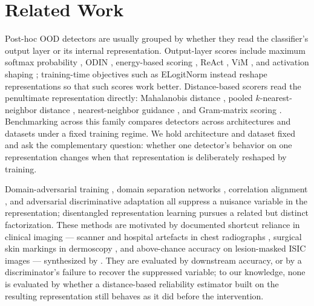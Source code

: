 \section{Related Work}
\label{sec:related-work}

Post-hoc OOD detectors are usually grouped by whether they read the classifier's output layer or its internal representation. Output-layer scores include maximum softmax probability \citep{hendrycks2017baseline}, ODIN \citep{liang2018enhancing}, energy-based scoring \citep{liu2020energy}, ReAct \citep{sun2021react}, ViM \citep{wang2022vim}, and activation shaping \citep{djurisic2023ash}; training-time objectives such as ELogitNorm \citep{ding2025enhancing} instead reshape representations so that such scores work better. Distance-based scorers read the penultimate representation directly: Mahalanobis distance \citep{lee2018simple}, pooled $k$-nearest-neighbor distance \citep{sun2022knn}, nearest-neighbor guidance \citep{park2023nnguide}, and Gram-matrix scoring \citep{sastry2020gram}. Benchmarking across this family \citep{yang2024oodsurvey, miyai2024generalized} compares detectors across architectures and datasets under a fixed training regime. We hold architecture and dataset fixed and ask the complementary question: whether one detector's behavior on one representation changes when that representation is deliberately reshaped by training.

Domain-adversarial training \citep{ganin2015unsupervised, ganin2016domain}, domain separation networks \citep{bousmalis2016domain}, correlation alignment \citep{sun2016coral}, and adversarial discriminative adaptation \citep{tzeng2017adversarial} all suppress a nuisance variable in the representation; disentangled representation learning \citep{higgins2017betavae, locatello2019challenging} pursues a related but distinct factorization. These methods are motivated by documented shortcut reliance in clinical imaging --- scanner and hospital artefacts in chest radiographs \citep{zech2018variable, degrave2021ai}, surgical skin markings in dermoscopy \citep{winkler2019association}, and above-chance accuracy on lesion-masked ISIC images \citep{bissoto2020debiasing} --- synthesized by \citet{geirhos2020shortcut}. They are evaluated by downstream accuracy, or by a discriminator's failure to recover the suppressed variable; to our knowledge, none is evaluated by whether a distance-based reliability estimator built on the resulting representation still behaves as it did before the intervention.

